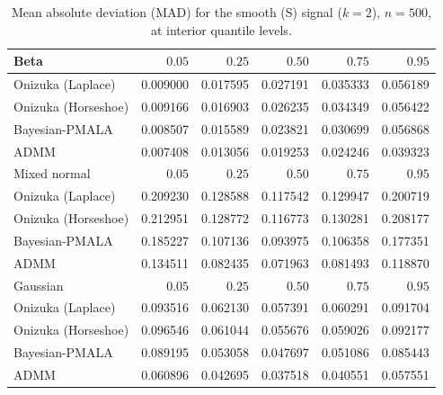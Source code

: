 \begin{table}[!htbp]
\centering
\small
\caption{Mean absolute deviation (MAD) for the smooth (S) signal ($k=2$), $n=500$, at interior quantile levels.}
\label{tab:s_int_mad}
\begin{tabular}{lrrrrr}
\toprule
Beta & $0.05$ & $0.25$ & $0.50$ & $0.75$ & $0.95$ \\
\midrule
Onizuka (Laplace) & 0.009000 & 0.017595 & 0.027191 & 0.035333 & 0.056189 \\
Onizuka (Horseshoe) & 0.009166 & 0.016903 & 0.026235 & 0.034349 & 0.056422 \\
Bayesian-PMALA & 0.008507 & 0.015589 & 0.023821 & 0.030699 & 0.056868 \\
ADMM & 0.007408 & 0.013056 & 0.019253 & 0.024246 & 0.039323 \\
\midrule
Mixed normal & $0.05$ & $0.25$ & $0.50$ & $0.75$ & $0.95$ \\
\midrule
Onizuka (Laplace) & 0.209230 & 0.128588 & 0.117542 & 0.129947 & 0.200719 \\
Onizuka (Horseshoe) & 0.212951 & 0.128772 & 0.116773 & 0.130281 & 0.208177 \\
Bayesian-PMALA & 0.185227 & 0.107136 & 0.093975 & 0.106358 & 0.177351 \\
ADMM & 0.134511 & 0.082435 & 0.071963 & 0.081493 & 0.118870 \\
\midrule
Gaussian & $0.05$ & $0.25$ & $0.50$ & $0.75$ & $0.95$ \\
\midrule
Onizuka (Laplace) & 0.093516 & 0.062130 & 0.057391 & 0.060291 & 0.091704 \\
Onizuka (Horseshoe) & 0.096546 & 0.061044 & 0.055676 & 0.059026 & 0.092177 \\
Bayesian-PMALA & 0.089195 & 0.053058 & 0.047697 & 0.051086 & 0.085443 \\
ADMM & 0.060896 & 0.042695 & 0.037518 & 0.040551 & 0.057551 \\
\bottomrule
\end{tabular}
\end{table}
